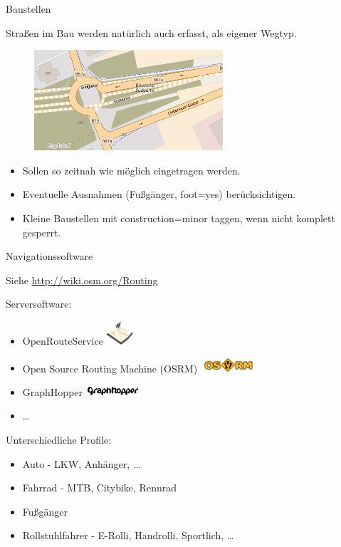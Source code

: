 \documentclass{beamer}
\begin{document}
\begin{frame}{Baustellen}

Straßen im Bau werden natürlich auch erfasst, als eigener Wegtyp.

\begin{figure}
  \centering
  \includegraphics[width=7cm]{suedguertel.png}
\end{figure}

\pause

\begin{itemize}
  \item Sollen so zeitnah wie möglich eingetragen werden.
  \item Eventuelle Ausnahmen (Fußgänger, foot=yes) berücksichtigen.
  \item Kleine Baustellen mit construction=minor taggen, wenn nicht komplett gesperrt.
\end{itemize}

\end{frame}

\begin{frame}{Navigationssoftware}

Siehe \url{http://wiki.osm.org/Routing}

 \vspace*{0.3cm}
Serversoftware:

 \vspace*{-0.3cm}
\begin{itemize}
  \item OpenRouteService \includegraphics[width=1cm]{ors.png}
  \item Open Source Routing Machine (OSRM) \includegraphics[width=2cm]{osrm.png}
  \item GraphHopper \includegraphics[width=2cm]{graphopper.png}
  \item \dots
\end{itemize}

\pause

Unterschiedliche Profile:
\begin{itemize}
  \item Auto - LKW, Anhänger, ...
  \item Fahrrad - MTB, Citybike, Rennrad
  \item Fußgänger
  \item Rollstuhlfahrer - E-Rolli, Handrolli, Sportlich, \dots
\end{itemize}

\end{frame}
\end{document}
